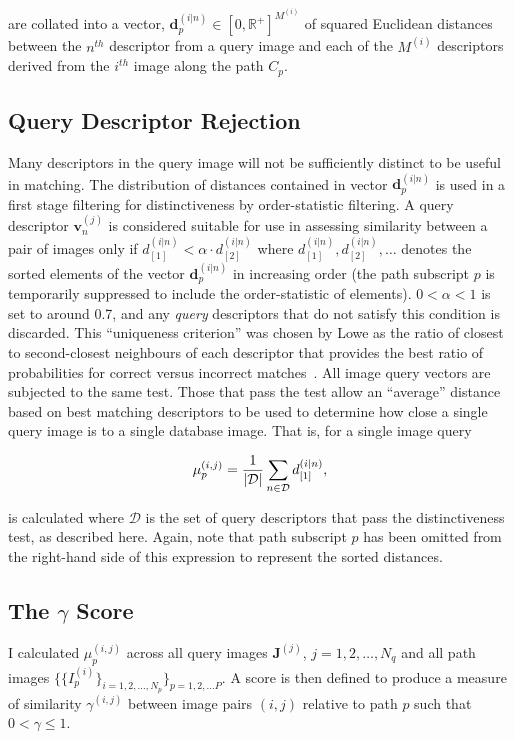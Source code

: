 are collated into a vector, $\mathbf{d}^{(i|n)}_p \in [0,\mathbb{R}^+]^{M^{(i)}}$ of squared Euclidean distances between the $n^{th}$ descriptor from a query image and each of the $M^{(i)}$ descriptors derived from the $i^{th}$ image along the path $C_p$. 

\subsection{Query Descriptor Rejection} \label{subsec:querydescrejection}
Many descriptors in the query image will not be sufficiently distinct to be useful in matching.  The distribution of distances contained in vector $\mathbf{d}^{(i|n)}_p$ is used in a first stage filtering for distinctiveness by order-statistic filtering.  A query descriptor $\mathbf{v}_n^{(j)}$ is considered suitable for use in assessing similarity between a pair of images only if $d^{(i|n)}_{[1]} < \alpha \cdot d^{(i|n)}_{[2]}$ where $d^{(i|n)}_{[1]}, d^{(i|n)}_{[2]},\ldots $ denotes the sorted elements of the vector $\mathbf{d}^{(i|n)}_p$ in increasing order (the path subscript $p$ is temporarily suppressed to include the order-statistic of elements).  $0<\alpha<1$ is set to around 0.7, and any \textit{query} descriptors that do not satisfy this condition is discarded. This ``uniqueness criterion'' was chosen by Lowe as the ratio of closest to second-closest neighbours of each descriptor that provides the best ratio of probabilities for correct versus incorrect matches~\cite{lowe2004distinctive}. All image query vectors are subjected to the same test.  Those that pass the test allow an ``average'' distance based on best matching descriptors to be used to determine how close a single query image is to a single database image. That is, for a single image query 

\begin{equation}
\centering
\mu^{(i,j)}_p=\frac{1}{|\mathcal{D}|}\sum_{n\in \mathcal{D}} d^{(i|n)}_{[1]},
\end{equation}

is calculated where $\mathcal{D}$ is the set of query descriptors that pass the distinctiveness test, as described here. Again, note that path subscript $p$ has been omitted from the right-hand side of this expression to represent the sorted distances.

\subsection{The $\gamma$ Score} I calculated  $\mu_p^{(i,j)}$ across all query images $\mathbf{J}^{(j)}$, $j=1,2,\ldots,N_q$ and all path images $\lbrace\lbrace I^{(i)}_p\rbrace_{i=1,2,\ldots,N_p}\rbrace_{p=1,2,\ldots P}$.   A score is then defined to produce a measure of similarity $\gamma^{(i,j)}$ between image pairs $(i,j)$ relative to path $p$ such that $0 < \gamma \le 1$. 


